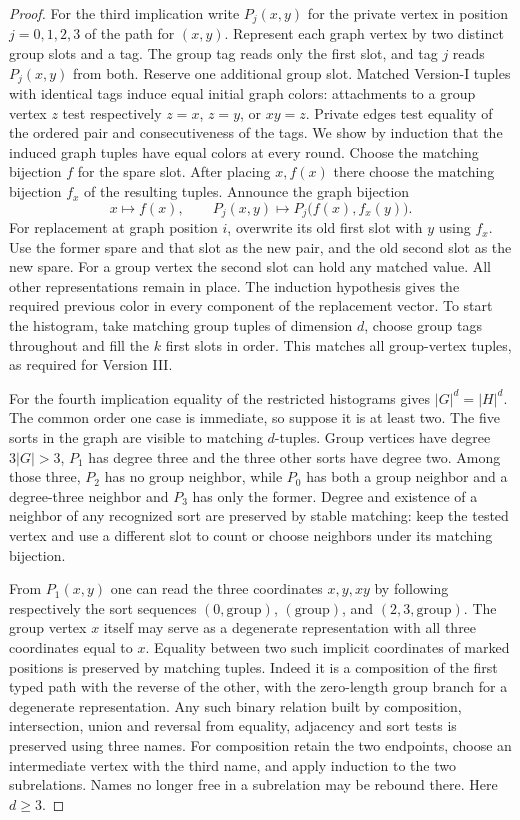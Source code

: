 \documentclass[11pt]{article}
\theoremstyle{definition}
\theoremstyle{remark}
\numberwithin{equation}{section}
\begin{document}
\begin{proof}
For the third implication write $P_j(x,y)$ for the private vertex in
position $j=0,1,2,3$ of the path for $(x,y)$. Represent each graph
vertex by two distinct group slots and a tag. The group tag reads
only the first slot, and tag $j$ reads $P_j(x,y)$ from both. Reserve
one additional group slot. Matched Version-I tuples with identical
tags induce equal initial graph colors: attachments to a group vertex
$z$ test respectively $z=x$, $z=y$, or $xy=z$. Private edges test
equality of the ordered pair and consecutiveness of the tags.
We show by induction that the induced graph tuples have equal colors
at every round. Choose the matching bijection $f$ for the spare slot.
After placing $x,f(x)$ there choose the matching bijection $f_x$ of
the resulting tuples. Announce the graph bijection
\[
 x\longmapsto f(x),\qquad
 P_j(x,y)\longmapsto P_j\bigl(f(x),f_x(y)\bigr).
\]
For replacement at graph position $i$, overwrite its old first slot
with $y$ using $f_x$. Use the former spare and that slot as the new
pair, and the old second slot as the new spare. For a group vertex the
second slot can hold any matched value. All other representations
remain in place. The induction hypothesis gives the required previous
color in every component of the replacement vector. To start the
histogram, take matching group tuples of dimension $d$, choose group
tags throughout and fill the $k$ first slots in order. This matches
all group-vertex tuples, as required for Version III.

For the fourth implication equality of the restricted histograms gives
$|G|^d=|H|^d$. The common order one case is immediate, so suppose it
is at least two. The five sorts in the graph are visible to matching
$d$-tuples. Group vertices have degree $3|G|>3$, $P_1$ has degree
three and the three other sorts have degree two. Among those three,
$P_2$ has no group neighbor, while $P_0$ has both a group neighbor and
a degree-three neighbor and $P_3$ has only the former. Degree and
existence of a neighbor of any recognized sort are preserved by stable
matching: keep the tested vertex and use a different slot to count or
choose neighbors under its matching bijection.

From $P_1(x,y)$ one can read the three coordinates $x,y,xy$ by
following respectively the sort sequences $(0,\mathrm{group})$,
$(\mathrm{group})$, and $(2,3,\mathrm{group})$. The group vertex $x$
itself may serve as a degenerate representation with all three
coordinates equal to $x$. Equality between two such implicit
coordinates of marked positions is preserved by matching tuples.
Indeed it is a composition of the first typed path with the reverse of
the other, with the zero-length group branch for a degenerate
representation. Any such binary relation built by composition,
intersection, union and reversal from equality, adjacency and sort
tests is preserved using three names. For composition retain the two
endpoints, choose an intermediate vertex with the third name, and
apply induction to the two subrelations. Names no longer free in a
subrelation may be rebound there. Here $d\ge3$.


\end{proof}
\end{document}
